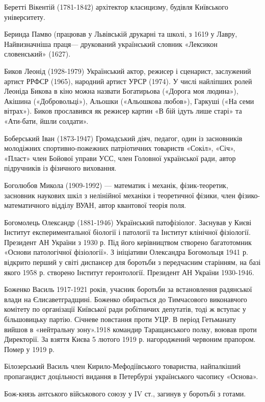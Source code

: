 Беретті Вікентій (1781-1842) архітектор класицизму, будівля Київського університету.

Беринда  Памво (працював у Львівській друкарні та школі, з 1619 у Лавру, Найвизначніша праця— друкований український словник «Лексикон словенський» (1627).

Биков Леонід (1928-1979) Український актор, режисер і сценарист, заслужений артист РРФСР (1965), народний артист УРСР (1974). У числі найліпших ролей Леоніда Бикова в кіно можна назвати Богатирьова («Дорога моя людина»), Акішина («Добровольці»), Альошки («Альошкова любов»), Гаркуші («На семи вітрах»). Биков прославився як режисер картин «В бій ідуть лише старі» та «Ати-бати, йшли солдати».

Боберський Іван (1873-1947) Громадський діяч, педагог, один із засновників молодіжних спортивно-пожежних патріотичних товариств «Сокіл», «Січ», «Пласт» член Бойової управи УСС, член Головної української ради, автор підручників із фізичного виховання.

Боголюбов Микола (1909-1992) --- математик і механік, фізик-теоретик, засновник наукових шкіл з нелінійної механіки і теоретичної фізики, член фізико-математичного відділу ВУАН, автор квантової теорія поля.

Богомолець Олександр (1881-1946) Український патофізіолог. Заснував у Києві Інститут експериментальної біології і патології та Інститут клінічної фізіології. Президент АН України з 1930 р. Під його керівництвом створено багатотомник «Основи патологічної фізіології». З ініціативи Олександра Богомольця 1941 р. відкрито перший у світі диспансер для боротьби з передчасним старінням, на базі якого 1958 р. створено Інститут геронтології. Президент АН України 1930-1946.

Боженко Василь 1917-1921 років, учасник боротьби за встановлення радянської влади  на Єлисаветградщині. Боженко обирається до Тимчасового виконавчого комітету по організації Київської ради робітничих депутатів, тоді ж вступає у більшовицьку партію. Січневе повстання проти УЦР. В період Гетьманату вийшов в «нейтральну зону».1918 командир Таращанського полку, воював проти Директорії. За взяття Києва 5 лютого 1919 р. нагороджений червоним прапором. Помер у 1919 р.

Білозерський Василь член Кирило-Мефодіївського товариства, найпалкіший пропагандист доцільності видання в Петербурзі українського часопису «Основа». 

Бож-князь антського військового союзу у IV ст., загинув у боротьбі з готами.

